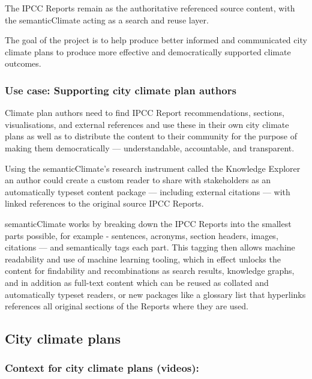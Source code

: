 \documentclass{article}
\begin{document}
The IPCC Reports remain as the authoritative referenced source content, with the semanticClimate acting as a search and reuse layer.


The goal of the project is to help produce better informed and communicated city climate plans to produce more effective and democratically supported climate outcomes.


\subsubsection{Use case: Supporting city climate plan authors}\label{H9688122}



Climate plan authors need to find IPCC Report recommendations, sections, visualisations, and external references and use these in their own city climate plans as well as to distribute the content to their community for the purpose of making them democratically — understandable, accountable, and transparent.


Using the semanticClimate’s research instrument called the Knowledge Explorer an author could create a custom reader to share with stakeholders as an automatically typeset content package — including external citations — with linked references to the original source IPCC Reports.


semanticClimate works by breaking down the IPCC Reports into the smallest parts possible, for example - sentences, acronyms, section headers, images, citations — and semantically tags each part. This tagging then allows machine readability and use of machine learning tooling, which in effect unlocks the content for findability and recombinations as search results, knowledge graphs, and in addition as full-text content which can be reused as collated and automatically typeset readers, or new packages like a glossary list that hyperlinks references all original sections of the Reports where they are used.


\subsection{City climate plans}\label{H3319789}



\subsubsection{Context for city climate plans (videos): }\label{H2408854}
\end{document}
